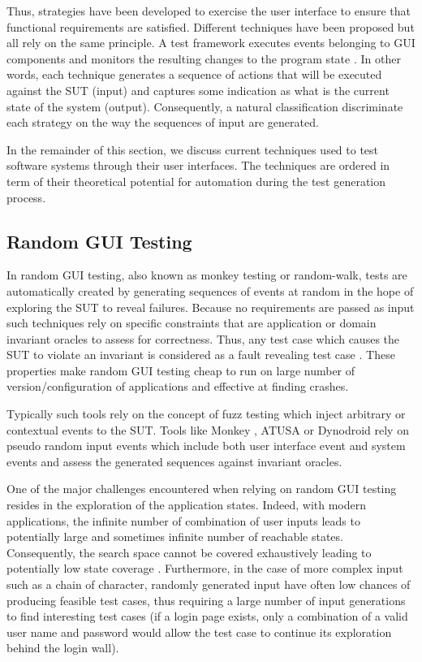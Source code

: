 Thus, strategies have been developed to exercise the user interface to ensure that functional requirements are satisfied. Different techniques have been proposed but all rely on the same principle. A test framework executes events belonging to GUI components and monitors the resulting changes to the program state \cite{Nguyen2014}. In other words, each technique generates a sequence of actions that will be executed against the SUT (input) and captures some indication as what is the current state of the system (output). Consequently, a natural classification discriminate each strategy on the way the sequences of input are generated.

In the remainder of this section, we discuss current techniques used to test software systems through their user interfaces. The techniques are ordered in term of their theoretical potential for automation during the test generation process.

\subsection{Random GUI Testing}
\label{sec:introduction-random-gui-testing}

In random GUI testing, also known as monkey testing or random-walk, tests are automatically created by generating sequences of events at random in the hope of exploring the SUT to reveal failures. Because no requirements are passed as input such techniques rely on specific constraints that are application or domain invariant oracles \cite{Mesbah2009} to assess for correctness. Thus, any test case which causes the SUT to violate an invariant is considered as a fault revealing test case \cite{Barr2015}. These properties make random GUI testing cheap to run on large number of version/configuration of applications and effective at finding crashes.

Typically such tools rely on the concept of fuzz testing which inject arbitrary or contextual events to the SUT. Tools like Monkey \cite{Google2020},  ATUSA \cite{Mesbah2012} or Dynodroid \cite{Machiry2013} rely on pseudo random input events which include both user interface event and system events and assess the generated sequences against invariant oracles. 

One of the major challenges encountered when relying on random GUI testing resides in the exploration of the application states. Indeed, with modern applications, the infinite number of combination of user inputs leads to potentially large and sometimes infinite number of reachable states. Consequently, the search space cannot be covered exhaustively leading to potentially low state coverage \cite{Canny2019}. Furthermore, in the case of more complex input such as a chain of character, randomly generated input have often low chances of producing feasible test cases, thus requiring a large number of input generations to find interesting test cases (\eg if a login page exists, only a combination of a valid user name and password would allow the test case to continue its exploration behind the login wall).

